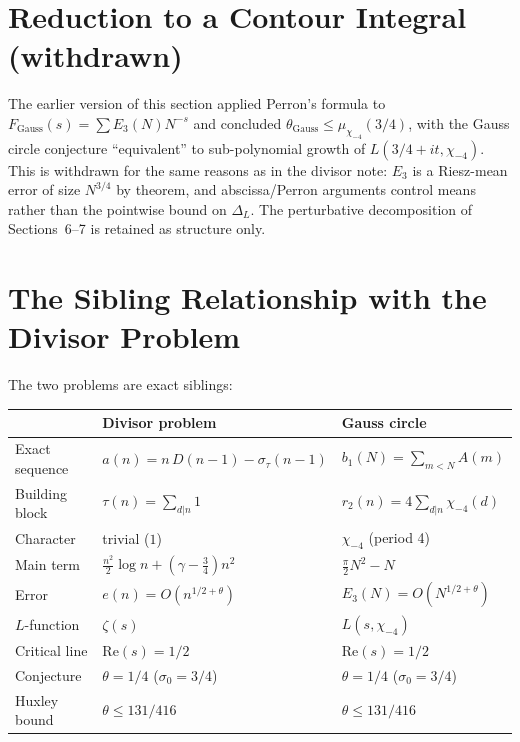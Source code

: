 \documentclass[12pt]{article}
\theoremstyle{definition}
\begin{document}
\section{Reduction to a Contour Integral (withdrawn)}

The earlier version of this section applied Perron's formula to
$F_{\mathrm{Gauss}}(s)=\sum E_3(N)N^{-s}$ and concluded
$\theta_{\mathrm{Gauss}}\le\mu_{\chi_{-4}}(3/4)$, with the Gauss circle conjecture
``equivalent'' to sub-polynomial growth of $L(3/4+it,\chi_{-4})$.  This is withdrawn for the
same reasons as in the divisor note: $E_3$ is a Riesz-mean error of size $N^{3/4}$ by theorem,
and abscissa/Perron arguments control means rather than the pointwise bound on $\Delta_L$.
The perturbative decomposition of Sections~6--7 is retained as structure only.

\section{The Sibling Relationship with the Divisor Problem}

The two problems are exact siblings:

\begin{center}
\renewcommand{\arraystretch}{1.4}
\begin{tabular}{lll}
\toprule
& \textbf{Divisor problem} & \textbf{Gauss circle}\\
\midrule
Exact sequence & $a(n) = n\,D(n-1)-\sigma_\tau(n-1)$ & $b_1(N) = \sum_{m<N}A(m)$\\
Building block & $\tau(n) = \sum_{d|n}1$ & $r_2(n) = 4\sum_{d|n}\chi_{-4}(d)$\\
Character & trivial ($1$) & $\chi_{-4}$ (period 4)\\
Main term & $\frac{n^2}{2}\log n + (\gamma-\frac{3}{4})n^2$ & $\frac{\pi}{2}N^2 - N$\\
Error & $e(n) = O(n^{1/2+\theta})$ & $E_3(N) = O(N^{1/2+\theta})$\\
$L$-function & $\zeta(s)$ & $L(s,\chi_{-4})$\\
Critical line & $\mathrm{Re}(s)=1/2$ & $\mathrm{Re}(s)=1/2$\\
Conjecture & $\theta = 1/4$ ($\sigma_0 = 3/4$) & $\theta = 1/4$ ($\sigma_0 = 3/4$)\\
Huxley bound & $\theta \le 131/416$ & $\theta \le 131/416$\\
\bottomrule
\end{tabular}
\end{center}
\end{document}
